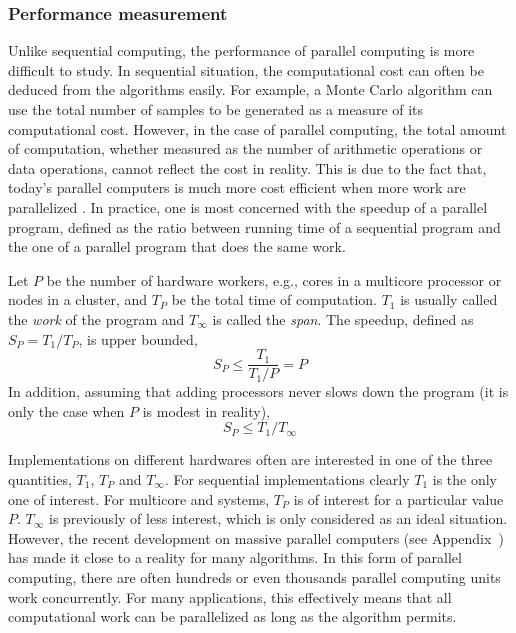 \subsubsection{Performance measurement}
\label{ssub:Performance measurement}

Unlike sequential computing, the performance of parallel computing is more
difficult to study. In sequential situation, the computational cost can often
be deduced from the algorithms easily. For example, a Monte Carlo algorithm
can use the total number of samples to be generated as a measure of its
computational cost. However, in the case of parallel computing, the total
amount of computation, whether measured as the number of arithmetic operations
or data operations, cannot reflect the cost in reality. This is due to the
fact that, today's parallel computers is much more cost efficient when more
work are parallelized \cite{parallel}. In practice, one is most concerned with
the speedup of a parallel program, defined as the ratio between running time
of a sequential program and the one of a parallel program that does the same
work.

Let $P$ be the number of hardware workers, e.g., cores in a multicore
processor or nodes in a cluster, and $T_P$ be the total time of computation.
$T_1$ is usually called the \emph{work} of the program and $T_{\infty}$ is
called the \emph{span}. The speedup, defined as $S_P = T_1/T_P$, is upper
bounded,
\begin{equation}
  S_P \le \frac{T_1}{T_1/P} = P
\end{equation}
In addition, assuming that adding processors never slows down the program (it
is only the case when $P$ is modest in reality),
\begin{equation}
  S_P \le T_1/T_{\infty}
\end{equation}

Implementations on different hardwares often are interested in one of the
three quantities, $T_1$, $T_P$ and $T_{\infty}$. For sequential
implementations clearly $T_1$ is the only one of interest. For multicore and
\smp systems, $T_P$ is of interest for a particular value $P$. $T_{\infty}$ is
previously of less interest, which is only considered as an ideal situation.
However, the recent development on massive parallel computers (see
Appendix~) has made it close to a
reality for many algorithms. In this form of parallel computing, there are
often hundreds or even thousands parallel computing units work concurrently.
For many applications, this effectively means that all computational work can
be parallelized as long as the algorithm permits.

